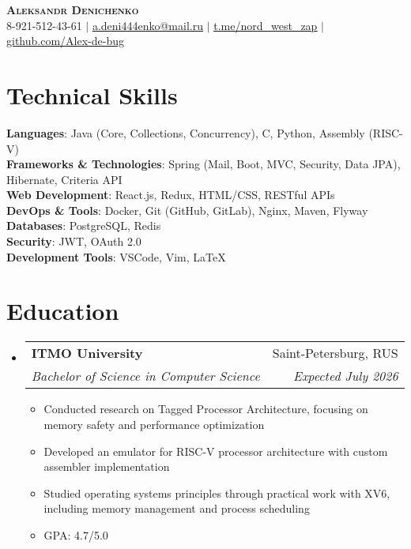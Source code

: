 \documentclass[letterpaper,11pt]{article}
\makeatletter
\newcommand{\resumeItem}[1]{
  \item\small{
    {#1 \vspace{-2pt}}
  }
}
\newcommand{\resumeSubheading}[4]{
  \vspace{-2pt}\item
    \begin{tabular*}{0.97\textwidth}[t]{l@{\extracolsep{\fill}}r}
      \textbf{#1} & #2 \\
      \textit{\small#3} & \textit{\small #4} \\
    \end{tabular*}\vspace{-7pt}
}
\newcommand{\resumeSubHeadingListStart}{\begin{itemize}[leftmargin=0.15in, label={}]}
\newcommand{\resumeSubHeadingListEnd}{\end{itemize}}
\newcommand{\resumeItemListStart}{\begin{itemize}}
\newcommand{\resumeItemListEnd}{\end{itemize}\vspace{-5pt}}
\makeatother
\begin{document}


\begin{center}
    \textbf{\Huge \scshape Aleksandr Denichenko} \\ \vspace{1pt}
    \small 8-921-512-43-61 $|$ \href{mailto:a.deni444enko@mail.ru}{\underline{a.deni444enko@mail.ru}} $|$ 
    \href{https://t.me/nord_west_zap}{\underline{t.me/nord\_west\_zap}} $|$
    \href{https://github.com/Alex-de-bug}{\underline{github.com/Alex-de-bug}}
\end{center}

\section{Technical Skills}
 \begin{itemize}[leftmargin=0.15in, label={}]
    \small{\item{
     \textbf{Languages}{: Java (Core, Collections, Concurrency), C, Python, Assembly (RISC-V)} \\
     \textbf{Frameworks \& Technologies}{: Spring (Mail, Boot, MVC, Security, Data JPA), Hibernate, Criteria API} \\
     \textbf{Web Development}{: React.js, Redux, HTML/CSS, RESTful APIs} \\
     \textbf{DevOps \& Tools}{: Docker, Git (GitHub, GitLab), Nginx, Maven, Flyway} \\
     \textbf{Databases}{: PostgreSQL, Redis} \\
     \textbf{Security}{: JWT, OAuth 2.0} \\
     \textbf{Development Tools}{: VSCode, Vim, LaTeX}
    }}
 \end{itemize}


\section{Education}
  \resumeSubHeadingListStart
    \resumeSubheading
      {ITMO University}{Saint-Petersburg, RUS}
      {Bachelor of Science in Computer Science}{Expected July 2026}
          \resumeItemListStart
            \resumeItem{Conducted research on Tagged Processor Architecture, focusing on memory safety and performance optimization}
            \resumeItem{Developed an emulator for RISC-V processor architecture with custom assembler implementation}
            \resumeItem{Studied operating systems principles through practical work with XV6, including memory management and process scheduling}
            \resumeItem{GPA: 4.7/5.0}
        \resumeItemListEnd
  \resumeSubHeadingListEnd
\end{document}
